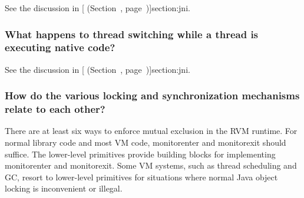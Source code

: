 See the discussion in [
  (Section~\Ref, page~\Pageref)]{section:jni}. 

\subsubsection{What happens to thread switching while a thread is
executing native code?}
See the discussion in [ (Section~\Ref, page~\Pageref)]{section:jni}. 

\subsubsection{How do the various locking and synchronization mechanisms
relate to each other?}

There are at least six ways to enforce mutual exclusion in the
RVM runtime.  For normal library code and most VM code, {\instruction monitorenter} and
{\instruction monitorexit} should suffice.  The lower-level primitives provide 
building blocks for implementing {\instruction monitorenter} and
{\instruction monitorexit}. Some VM systems,
such as thread scheduling and GC, resort to lower-level primitives for
situations where normal Java object locking is inconvenient or illegal.
